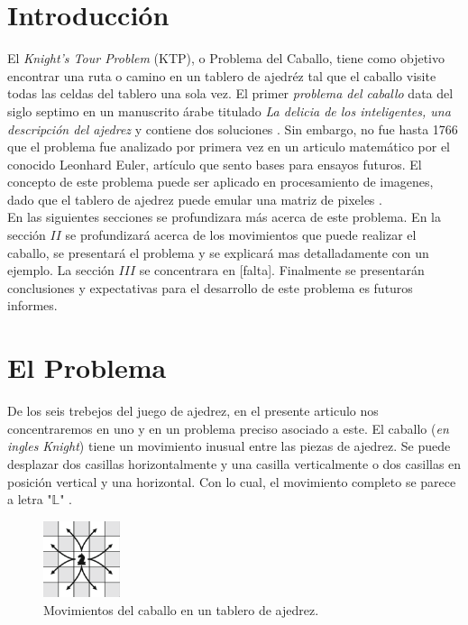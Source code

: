 \documentclass[journal, 10pt]{IEEEtran}
\begin{document}
\section{Introducci\'on}
El \textit{Knight's Tour Problem} (KTP), o Problema del Caballo, tiene como objetivo encontrar una ruta o camino en un tablero de ajedr\'ez tal que el caballo visite todas las celdas del tablero una sola vez.
El primer \textit{problema del caballo} data del siglo septimo en un manuscrito \'arabe titulado \textit{La delicia de los inteligentes, una descripci\'on del ajedrez} y contiene dos soluciones \cite{Murray:1913}. Sin embargo, no fue hasta 1766 que el problema fue analizado por primera vez en un articulo matem\'atico \cite{Euler:1759} por el conocido Leonhard Euler, art\'iculo que sento bases para ensayos futuros. El concepto de este problema puede ser aplicado en procesamiento de imagenes, dado que el tablero de ajedrez puede emular una matriz de pixeles \cite{Xiaoyong:2017}.\\
En las siguientes secciones se profundizara m\'as acerca de este problema. En la secci\'on $II$ se profundizar\'a acerca de los movimientos que puede realizar el caballo, se presentar\'a el problema y se explicar\'a mas detalladamente con un ejemplo. La secci\'on $III$ se concentrara en [falta]. Finalmente se presentar\'an conclusiones y expectativas para el desarrollo de este problema es futuros informes.

\section{El Problema}
De los seis trebejos del juego de ajedrez, en el presente articulo nos concentraremos en uno y en un problema preciso asociado a este. El caballo (\textit{en ingles Knight}) tiene un movimiento inusual entre las piezas de ajedrez. Se puede desplazar dos casillas horizontalmente y una casilla verticalmente o dos casillas en posición vertical y una horizontal. Con lo cual, el movimiento completo se parece a letra "$\mathbb{L}$"  \cite{Uehara:2019}.

\begin{figure}[h]

\centering
\includegraphics[width=0.2\textwidth]{figures/k_moves.png}
\caption{Movimientos del caballo en un tablero de ajedrez.}
\label{fig:moves}

\end{figure}
\end{document}
